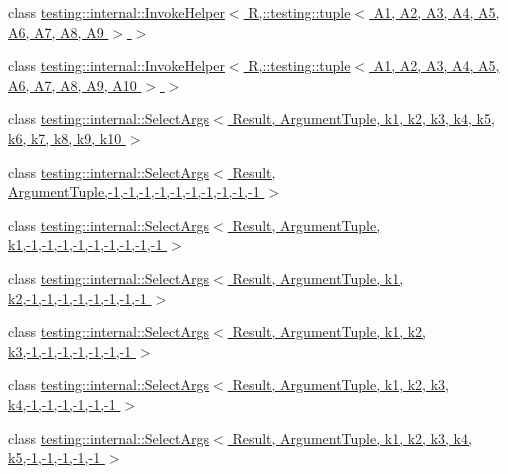 \begin{DoxyCompactItemize}
\item 
class \hyperlink{classtesting_1_1internal_1_1InvokeHelper_3_01R_00_1_1testing_1_1tuple_3_01A1_00_01A2_00_01A3_00_84580538a045b2e1759bc29528d8207c}{testing\+::internal\+::\+Invoke\+Helper$<$ R,\+::testing\+::tuple$<$ A1, A2, A3, A4, A5, A6, A7, A8, A9 $>$ $>$}
\item 
class \hyperlink{classtesting_1_1internal_1_1InvokeHelper_3_01R_00_1_1testing_1_1tuple_3_01A1_00_01A2_00_01A3_00_4b05aa1103fc4c073e11060d6839ad21}{testing\+::internal\+::\+Invoke\+Helper$<$ R,\+::testing\+::tuple$<$ A1, A2, A3, A4, A5, A6, A7, A8, A9, A10 $>$ $>$}
\item 
class \hyperlink{classtesting_1_1internal_1_1SelectArgs}{testing\+::internal\+::\+Select\+Args$<$ Result, Argument\+Tuple, k1, k2, k3, k4, k5, k6, k7, k8, k9, k10 $>$}
\item 
class \hyperlink{classtesting_1_1internal_1_1SelectArgs_3_01Result_00_01ArgumentTuple_00-1_00-1_00-1_00-1_00-1_00-1_00-1_00-1_00-1_00-1_01_4}{testing\+::internal\+::\+Select\+Args$<$ Result, Argument\+Tuple,-\/1,-\/1,-\/1,-\/1,-\/1,-\/1,-\/1,-\/1,-\/1,-\/1 $>$}
\item 
class \hyperlink{classtesting_1_1internal_1_1SelectArgs_3_01Result_00_01ArgumentTuple_00_01k1_00-1_00-1_00-1_00-1_00-1_00-1_00-1_00-1_00-1_01_4}{testing\+::internal\+::\+Select\+Args$<$ Result, Argument\+Tuple, k1,-\/1,-\/1,-\/1,-\/1,-\/1,-\/1,-\/1,-\/1,-\/1 $>$}
\item 
class \hyperlink{classtesting_1_1internal_1_1SelectArgs_3_01Result_00_01ArgumentTuple_00_01k1_00_01k2_00-1_00-1_08f7e2e7b6e994b5dc88747b054e9df66}{testing\+::internal\+::\+Select\+Args$<$ Result, Argument\+Tuple, k1, k2,-\/1,-\/1,-\/1,-\/1,-\/1,-\/1,-\/1,-\/1 $>$}
\item 
class \hyperlink{classtesting_1_1internal_1_1SelectArgs_3_01Result_00_01ArgumentTuple_00_01k1_00_01k2_00_01k3_00-ec796500c928719576d12fb062fb620e}{testing\+::internal\+::\+Select\+Args$<$ Result, Argument\+Tuple, k1, k2, k3,-\/1,-\/1,-\/1,-\/1,-\/1,-\/1,-\/1 $>$}
\item 
class \hyperlink{classtesting_1_1internal_1_1SelectArgs_3_01Result_00_01ArgumentTuple_00_01k1_00_01k2_00_01k3_00_164a629d34739a5312e400f464e1fa29}{testing\+::internal\+::\+Select\+Args$<$ Result, Argument\+Tuple, k1, k2, k3, k4,-\/1,-\/1,-\/1,-\/1,-\/1,-\/1 $>$}
\item 
class \hyperlink{classtesting_1_1internal_1_1SelectArgs_3_01Result_00_01ArgumentTuple_00_01k1_00_01k2_00_01k3_00_03a25384b3e8dae1359a943456ce6fe0}{testing\+::internal\+::\+Select\+Args$<$ Result, Argument\+Tuple, k1, k2, k3, k4, k5,-\/1,-\/1,-\/1,-\/1,-\/1 $>$}

\end{DoxyCompactItemize}
